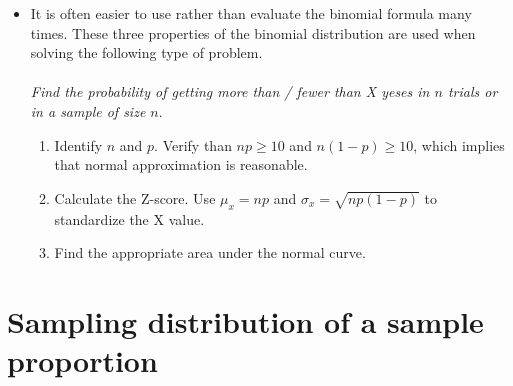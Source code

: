 \begin{itemize}
\item It is often easier to use  rather than evaluate the binomial formula many times. These three properties of the binomial distribution are used when solving the following type of problem.  
\\
\\ \textit{Find the probability of getting more than / fewer than X yeses in $n$ trials or in a sample of size $n$}.  
\begin{enumerate}\vspace{-1mm}
\setlength{\itemsep}{0mm}
\item Identify $n$ and $p$. Verify than $np\ge 10$ and $n(1-p)\ge 10$, which implies that normal approximation is reasonable. 
\item Calculate the Z-score.  Use $\mu_x = np$ and $\sigma_x = \sqrt{np(1-p)}$ to standardize the X value.  
\item Find the appropriate area under the normal curve.   
\end{enumerate}

\end{itemize}


{}



\section[Sampling distribution of a sample proportion]{Sampling distribution of a sample proportion }
\label{distributionphat}

